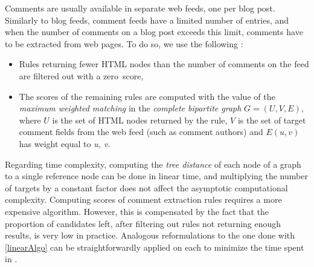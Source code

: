 Comments are usually available in separate web feeds, one per blog post. 
Similarly to blog feeds, comment feeds have a limited number of entries, 
and when the number of comments on a blog post exceeds this limit, 
comments have to be extracted from web pages. To do so, we use the 
following :

\begin{itemize}
\item 
Rules returning fewer HTML nodes than the number of comments on the feed 
are filtered out with a zero~score,
\item 
The scores of the remaining rules are computed with the value of the 
\emph{maximum weighted matching} in the \emph{complete bipartite graph} 
$G = (U, V, E)$, where $U$ is the set of HTML nodes returned by the rule, 
$V$ is the set of target comment fields from the web feed (such as 
comment authors) and $E(u, v)$ has weight equal to 
\code{(}\emph{u, v}\code{)}.
\end{itemize}

Regarding time complexity, computing the \emph{tree distance} of each 
node of a graph to a single reference node can be done in linear time, 
and multiplying the number of targets by a constant factor does not 
affect the asymptotic computational complexity. Computing scores of 
comment extraction rules requires a more expensive algorithm. However, 
this is compensated by the fact that the proportion of candidates left, 
after filtering out rules not returning enough results, is very low in 
practice. Analogous reformulations to the one done with 
\autoref{linearAlgo} can be straightforwardly applied on each 
 to minimize the time spent in 
.

